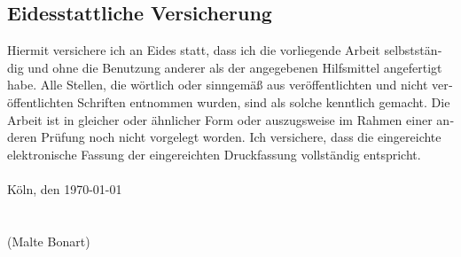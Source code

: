 \documentclass[a4paper, bibtotocnumbered,liststotoc,12pt]{scrartcl}
\theoremstyle{definition}
\theoremstyle{remark}
\numberwithin{figure}{section}
\numberwithin{table}{section}
\numberwithin{equation}{section}
\begin{document}
\begin{otherlanguage}{ngerman}
	
	\section*{Eidesstattliche Versicherung}
	
	 Hiermit versichere ich an Eides statt, dass ich die vorliegende Arbeit selbstständig und ohne die Benutzung anderer als der angegebenen Hilfsmittel angefertigt habe. Alle Stellen, die wörtlich oder sinngemäß aus veröffentlichten und nicht veröffentlichten Schriften entnommen wurden, sind als solche kenntlich gemacht. Die Arbeit ist in gleicher oder ähnlicher Form oder auszugsweise im Rahmen einer anderen Prüfung noch nicht vorgelegt worden. Ich versichere, dass die eingereichte elektronische Fassung der eingereichten Druckfassung vollständig entspricht. \\
	\\
	K\"oln, den \today
	\\
	\\
	\\
	(Malte Bonart)
\end{otherlanguage}


%
%
\end{document}
